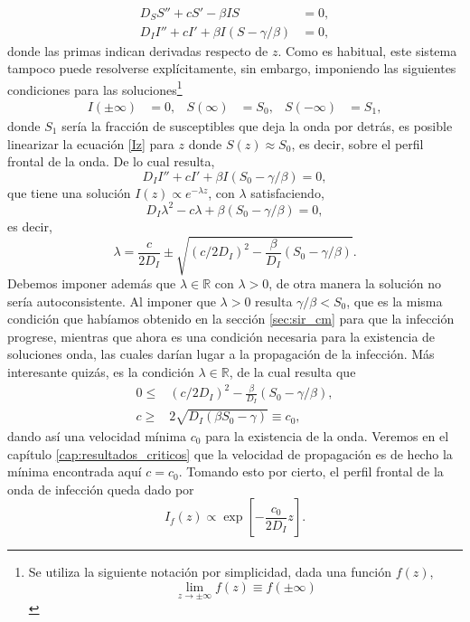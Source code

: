 \begin{align}
  D_S S''+ cS'-\beta IS &=0,\label{Sz} \\[.3cm] D_I I'' + cI' + \beta I(S-\gamma/\beta)&=0, \label{Iz}
\end{align}
donde las primas indican derivadas respecto de $z$. Como es habitual, este sistema tampoco puede resolverse explícitamente, sin embargo, imponiendo las 
siguientes condiciones para las soluciones\footnote{Se utiliza la siguiente notación por simplicidad, dada una función $f(z)$, 
\[\lim_{z\to\pm\infty}f(z)\equiv f(\pm\infty)\]}
\begin{align*}
  I(\pm\infty)&=0,   &  S(\infty) &= S_0,  & S(-\infty) &= S_1,   
\end{align*}
donde $S_1$ sería la fracción de susceptibles que deja la onda por detrás, es posible linearizar la ecuación \ref{Iz} para $z$ donde $S(z)\approx S_0$,
es decir, sobre el perfil frontal de la onda. De lo cual resulta,
\begin{equation}
  D_I I'' + cI'+\beta I(S_0-\gamma/\beta)=0,\label{Idez}
\end{equation}
que tiene una solución $I(z)\propto e^{-\lambda z}$, con $\lambda$ satisfaciendo,
\[D_I \lambda^2 - c \lambda +\beta(S_0-\gamma/\beta)=0,\]
es decir,
\[\lambda = \frac{c}{2D_I}\pm \sqrt{(c/2D_I)^2-\frac{\beta}{D_I}(S_0-\gamma/\beta)}.\]
Debemos imponer además que $\lambda \in \mathds R$ con $\lambda>0$, de otra manera la solución no sería autoconsistente. Al imponer que $\lambda>0$ 
resulta $\gamma/\beta<S_0$, que es la misma condición que habíamos obtenido en la sección \ref{sec:sir_cm} para que la infección progrese, 
mientras que ahora es una condición necesaria para la existencia de soluciones onda, las cuales darían lugar a la 
propagación de la infección. Más interesante quizás, es la condición $\lambda \in \mathds{R}$, de la cual resulta que 
\begin{align}
  0\leq&(c/2D_I)^2-\frac{\beta}{D_I}(S_0-\gamma/\beta),\nonumber \\[.3cm]
  c\geq&2\sqrt{D_I(\beta S_0-\gamma)}\equiv c_0, \label{eq:c0}
\end{align}
dando así una velocidad mínima $c_0$ para la existencia de la onda. Veremos en el capítulo \ref{cap:resultados_criticos} que la velocidad de propagación es de hecho
la mínima encontrada aquí $c=c_0$. Tomando esto por cierto, el perfil frontal de la onda de infección queda dado por 
\begin{equation}
  I_f(z)\propto \exp[-\frac{c_0}{2D_I}z].\label{larika2}  
\end{equation}

